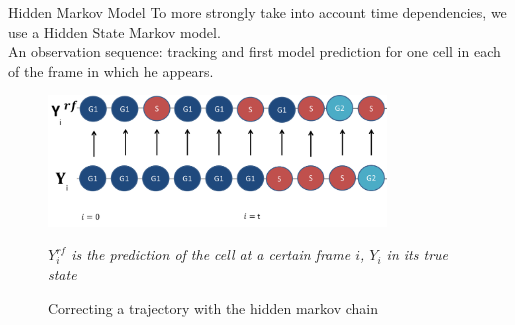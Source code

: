 \documentclass{beamer}
\newcommand{\matindex}[1]{\mbox{\scriptsize#1}}%
\begin{document}
\fi

\iffalse

\begin{frame}{Hidden Markov Model}
To more strongly take into account time dependencies, we use a Hidden State Markov model. \\
An observation sequence: tracking and first model prediction for one cell in each of the frame in which he appears. 
\begin{figure}[!ht]
\centering
\includegraphics[width=0.8\textwidth]{Images/HMM.png}
\caption{Correcting a trajectory with the hidden markov chain}
\label{trajectory}
\textit{$Y^{rf}_i$ is the prediction of the cell at a certain frame $i$, $Y_i$ in its true state}
\end{figure}

\end{frame}
\end{document}
